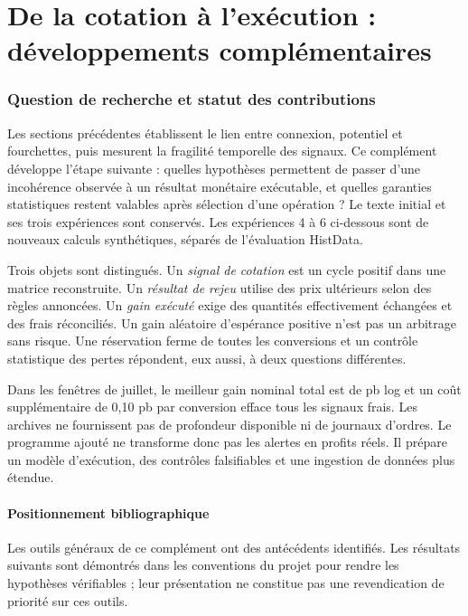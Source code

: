 \clearpage
\part{De la cotation à l'exécution : développements complémentaires}
\label{part:execution-extension}

\newcommand{\Prob}{\mathbb P}
\newcommand{\Esp}{\mathbb E}

\section{Question de recherche et statut des contributions}
\label{sec:ext-perimetre}

Les sections précédentes établissent le lien entre connexion, potentiel et fourchettes, puis mesurent la fragilité temporelle des signaux. Ce complément développe l'étape suivante : quelles hypothèses permettent de passer d'une incohérence observée à un résultat monétaire exécutable, et quelles garanties statistiques restent valables après sélection d'une opération ? Le texte initial et ses trois expériences sont conservés. Les expériences 4 à 6 ci-dessous sont de nouveaux calculs synthétiques, séparés de l'évaluation HistData.

Trois objets sont distingués. Un \emph{signal de cotation} est un cycle positif dans une matrice reconstruite. Un \emph{résultat de rejeu} utilise des prix ultérieurs selon des règles annoncées. Un \emph{gain exécuté} exige des quantités effectivement échangées et des frais réconciliés. Un gain aléatoire d'espérance positive n'est pas un arbitrage sans risque. Une réservation ferme de toutes les conversions et un contrôle statistique des pertes répondent, eux aussi, à deux questions différentes.

Dans les fenêtres de juillet, le meilleur gain nominal total est de \JuilletGainPic{} pb log et un coût supplémentaire de 0,10 pb par conversion efface tous les signaux frais. Les archives ne fournissent pas de profondeur disponible ni de journaux d'ordres. Le programme ajouté ne transforme donc pas les \JuilletNet{} alertes en profits réels. Il prépare un modèle d'exécution, des contrôles falsifiables et une ingestion de données plus étendue.

\subsection{Positionnement bibliographique}

Les outils généraux de ce complément ont des antécédents identifiés. Les résultats suivants sont démontrés dans les conventions du projet pour rendre les hypothèses vérifiables ; leur présentation ne constitue pas une revendication de priorité sur ces outils.

